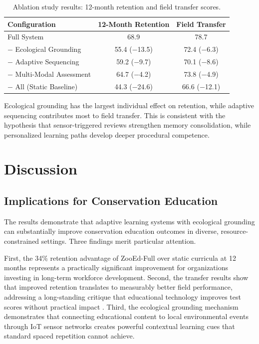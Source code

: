 \documentclass[11pt,a4paper]{article}
\begin{document}
\begin{table}[H]
\centering
\caption{Ablation study results: 12-month retention and field transfer scores.}
\label{tab:ablation}
\begin{tabular}{@{}lcc@{}}
\toprule
\textbf{Configuration} & \textbf{12-Month Retention} & \textbf{Field Transfer} \\
\midrule
Full System & 68.9 & 78.7 \\
$-$ Ecological Grounding & 55.4 ($-$13.5) & 72.4 ($-$6.3) \\
$-$ Adaptive Sequencing & 59.2 ($-$9.7) & 70.1 ($-$8.6) \\
$-$ Multi-Modal Assessment & 64.7 ($-$4.2) & 73.8 ($-$4.9) \\
$-$ All (Static Baseline) & 44.3 ($-$24.6) & 66.6 ($-$12.1) \\
\bottomrule
\end{tabular}
\end{table}

Ecological grounding has the largest individual effect on retention, while adaptive sequencing contributes most to field transfer.
This is consistent with the hypothesis that sensor-triggered reviews strengthen memory consolidation, while personalized learning paths develop deeper procedural competence.

\section{Discussion}
\label{sec:discussion}

\subsection{Implications for Conservation Education}

The results demonstrate that adaptive learning systems with ecological grounding can substantially improve conservation education outcomes in diverse, resource-constrained settings.
Three findings merit particular attention.

First, the 34\% retention advantage of ZooEd-Full over static curricula at 12 months represents a practically significant improvement for organizations investing in long-term workforce development.
Second, the transfer results show that improved retention translates to measurably better field performance, addressing a long-standing critique that educational technology improves test scores without practical impact \citep{stern2014value}.
Third, the ecological grounding mechanism demonstrates that connecting educational content to local environmental events through IoT sensor networks creates powerful contextual learning cues that standard spaced repetition cannot achieve.
\end{document}
